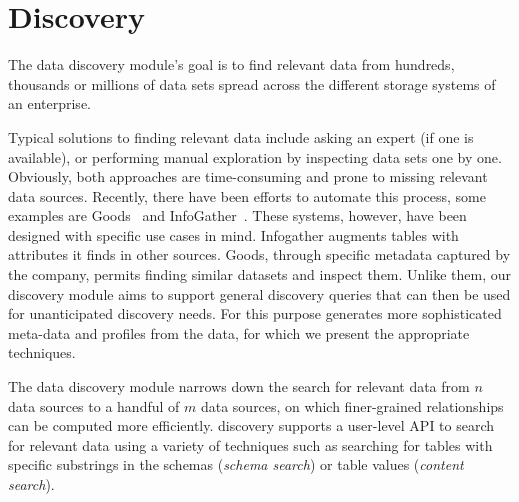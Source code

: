 \section{Discovery}
\label{sec:discovery}

The data discovery module's goal is to find relevant data from hundreds,
thousands or millions of data sets  spread across the different storage systems
of an enterprise.

Typical solutions to finding relevant data include asking an expert (if one is
available), or  performing manual exploration by inspecting data sets one by
one. Obviously, both approaches are time-consuming and prone to missing
relevant data sources. Recently, there have been efforts to automate this
process, some examples are Goods~\cite{DBLP:conf/sigmod/HalevyKNOPRW16}
and InfoGather~\cite{DBLP:conf/sigmod/YakoutGCC12}. These systems, however, have been designed with specific use cases in mind. Infogather augments tables with attributes it finds in other sources. Goods, through specific metadata captured by the company, permits finding similar datasets and inspect them. Unlike them, our discovery module aims to support general discovery queries that can then be used for unanticipated discovery needs. For this purpose \dcv generates more sophisticated meta-data and profiles from the data, for which we present the appropriate techniques.

%


The data discovery module narrows down the search for relevant data from $n$
data sources to a handful of $m$ data sources, on which finer-grained
relationships can be computed more efficiently. \dcv discovery supports a
user-level API to search for relevant data using a variety of techniques such as
searching for tables with specific substrings in the schemas ({\it schema
search}) or table values ({\it content search}). 

